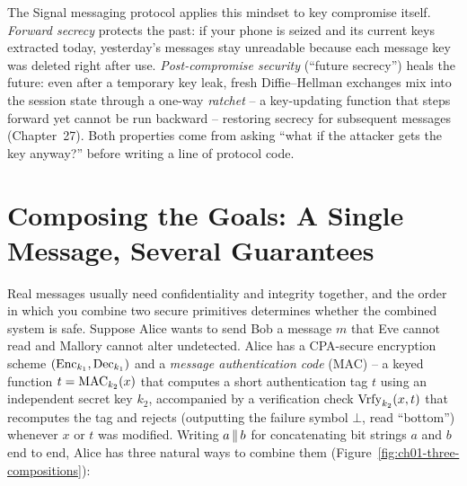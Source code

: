 \begin{applicationbox}
The Signal messaging protocol applies this mindset to key compromise itself. \emph{Forward secrecy} protects the past: if your phone is seized and its current keys extracted today, yesterday's messages stay unreadable because each message key was deleted right after use. \emph{Post-compromise security} (``future secrecy'') heals the future: even after a temporary key leak, fresh Diffie--Hellman exchanges mix into the session state through a one-way \emph{ratchet} -- a key-updating function that steps forward yet cannot be run backward -- restoring secrecy for subsequent messages (Chapter~27). Both properties come from asking ``what if the attacker gets the key anyway?'' before writing a line of protocol code.
\end{applicationbox}

\section{Composing the Goals: A Single Message, Several Guarantees}
\label{ch01:composition}

Real messages usually need confidentiality and integrity together, and the order in which you combine two secure primitives determines whether the combined system is safe. Suppose Alice wants to send Bob a message $m$ that Eve cannot read and Mallory cannot alter undetected. Alice has a CPA-secure encryption scheme $(\operatorname{Enc}_{k_1}, \operatorname{Dec}_{k_1})$ and a \emph{message authentication code} (MAC) -- a keyed function $t = \operatorname{MAC}_{k_2}(x)$ that computes a short authentication tag $t$ using an independent secret key $k_2$, accompanied by a verification check $\operatorname{Vrfy}_{k_2}(x, t)$ that recomputes the tag and rejects (outputting the failure symbol $\bot$, read ``bottom'') whenever $x$ or $t$ was modified. Writing $a \,\|\, b$ for concatenating bit strings $a$ and $b$ end to end, Alice has three natural ways to combine them (Figure~\ref{fig:ch01-three-compositions}):

